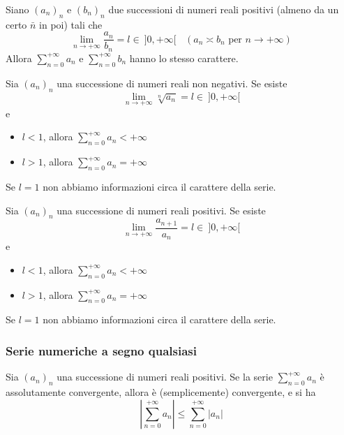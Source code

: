 \documentclass{article}
\begin{document}
\begin{shadedTheorem}
    Siano $(a_n)_n$ e $(b_n)_n$ due successioni di numeri reali positivi (almeno da un certo $\bar{n}$ in poi) tali che 
    \[\lim_{n\to +\infty}\frac{a_n}{b_n}=l\in \:]0,+\infty[~~~~\left( a_n\asymp b_n \text{ per } n\to+\infty \right)\]
    Allora $\sum_{n=0}^{+\infty}a_n$ e $\sum_{n=0}^{+\infty}b_n$ hanno lo stesso carattere.
\end{shadedTheorem}

\begin{shadedTheorem}
    Sia $(a_n)_n$ una successione di numeri reali non negativi. Se esiste 
    \[\lim_{n\to +\infty }\sqrt[n]{a_n}=l\in \:]0,+\infty[\]
    e 
    \begin{itemize}
        \item $l<1$, allora $\sum_{n=0}^{+\infty}a_n<+\infty$
        \item $l>1$, allora $\sum_{n=0}^{+\infty}a_n=+\infty$
    \end{itemize}
\end{shadedTheorem}
Se $l=1$ non abbiamo informazioni circa il carattere della serie.
\begin{shadedTheorem}
    Sia $(a_n)_n$ una successione di numeri reali positivi. Se esiste 
    \[\lim_{n\to +\infty }\frac{a_{n+1}}{a_n}=l\in \:]0,+\infty[\]
    e 
    \begin{itemize}
        \item $l<1$, allora $\sum_{n=0}^{+\infty}a_n<+\infty$
        \item $l>1$, allora $\sum_{n=0}^{+\infty}a_n=+\infty$
    \end{itemize}
\end{shadedTheorem}
Se $l=1$ non abbiamo informazioni circa il carattere della serie.
\subsubsection*{Serie numeriche a segno qualsiasi}
\begin{shadedTheorem}
    Sia $(a_n)_n$ una successione di numeri reali positivi. Se la serie $\sum_{n=0}^{+\infty}a_n$ è assolutamente convergente, allora è (semplicemente) convergente, e si ha 
    \[\left|\sum_{n=0}^{+\infty}a_n\right|\leq \sum_{n=0}^{+\infty}\left|a_n\right|\]
\end{shadedTheorem}
\end{document}

